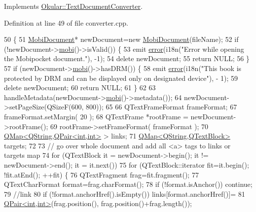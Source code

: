 Implements \hyperlink{classOkular_1_1TextDocumentConverter_ad05f8bcde0f347c6292968fab331bcef}{Okular\+::\+Text\+Document\+Converter}.



Definition at line 49 of file converter.\+cpp.


\begin{DoxyCode}
50 \{
51   \hyperlink{classMobi_1_1MobiDocument}{MobiDocument}* newDocument=\textcolor{keyword}{new} \hyperlink{classMobi_1_1MobiDocument}{MobiDocument}(fileName);
52   \textcolor{keywordflow}{if} (!newDocument->\hyperlink{classMobi_1_1MobiDocument_a22ca18d34e4e1f9f3aacf54ed7d274c8}{mobi}()->isValid()) \{
53     emit \hyperlink{classOkular_1_1TextDocumentConverter_a93f1335bdd8232626364c973d9d7e6b4}{error}(i18n(\textcolor{stringliteral}{"Error while opening the Mobipocket document."}), -1);
54     \textcolor{keyword}{delete} newDocument;
55     \textcolor{keywordflow}{return} NULL;
56   \}
57   \textcolor{keywordflow}{if} (newDocument->\hyperlink{classMobi_1_1MobiDocument_a22ca18d34e4e1f9f3aacf54ed7d274c8}{mobi}()->hasDRM()) \{
58     emit \hyperlink{classOkular_1_1TextDocumentConverter_a93f1335bdd8232626364c973d9d7e6b4}{error}(i18n(\textcolor{stringliteral}{"This book is protected by DRM and can be displayed only on designated device"}), -
      1);
59     \textcolor{keyword}{delete} newDocument;
60     \textcolor{keywordflow}{return} NULL;
61   \}
62   
63   handleMetadata(newDocument->\hyperlink{classMobi_1_1MobiDocument_a22ca18d34e4e1f9f3aacf54ed7d274c8}{mobi}()->metadata());
64   newDocument->setPageSize(QSizeF(600, 800));
65 
66   QTextFrameFormat frameFormat;
67   frameFormat.setMargin( 20 );
68   QTextFrame *rootFrame = newDocument->rootFrame();
69   rootFrame->setFrameFormat( frameFormat ); 
70   \hyperlink{classQMap}{QMap<QString,QPair<int,int>} > links;
71   \hyperlink{classQMap}{QMap<QString,QTextBlock>} targets;
72 
73   \textcolor{comment}{// go over whole document and add all <a> tags to links or targets map}
74   \textcolor{keywordflow}{for} (QTextBlock it = newDocument->begin(); it != newDocument->end(); it = it.next()) 
75    \textcolor{keywordflow}{for} (QTextBlock::iterator fit=it.begin(); !fit.atEnd(); ++fit) \{
76     QTextFragment frag=fit.fragment();
77     QTextCharFormat format=frag.charFormat();
78     \textcolor{keywordflow}{if} (!format.isAnchor()) \textcolor{keywordflow}{continue};
79     \textcolor{comment}{//link}
80     \textcolor{keywordflow}{if} (!format.anchorHref().isEmpty()) links[format.anchorHref()]=
81       \hyperlink{structQPair}{QPair<int,int>}(frag.position(), frag.position()+frag.length());

\end{DoxyCode}
